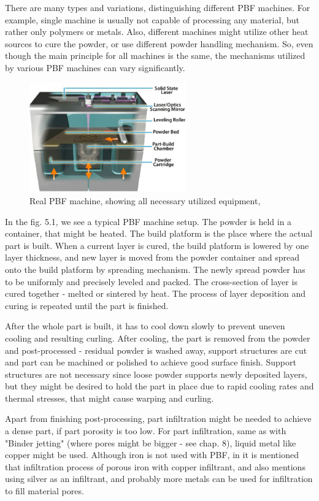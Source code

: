 \documentclass[a4paper, 11pt, reqno]{report}
\begin{document}
	There are many types and variations, distinguishing different PBF machines. For example, single machine is usually not capable of processing any material, but rather only polymers or metals. Also, different machines might utilize other heat sources to cure the powder, or use different powder handling mechanism. So, even though the main principle for all machines is the same, the mechanisms utilized by various PBF machines can vary significantly.
\\
\begin{figure}[b!]
	\centering
 	\includegraphics[width=0.6\textwidth]{sls}
	\caption{Real PBF machine, showing all necessary utilized equipment, \cite{sheena} }
\end{figure}
	In the fig. 5.1, we see a typical PBF machine setup. The powder is held in a container, that might be heated. The build platform is the place where the actual part is built. When a current layer is cured, the build platform is lowered by one layer thickness, and new layer is moved from the powder container and spread onto the build platform by spreading mechanism. The newly spread powder has to be uniformly and precisely leveled and packed. The cross-section of layer is cured together - melted or sintered by heat. The process of layer deposition and curing is repeated until the part is finished.

	After the whole part is built, it has to cool down slowly to prevent uneven cooling and resulting curling. After cooling, the part is removed from the powder and post-processed - residual powder is washed away, support structures are cut and part can be machined or polished to achieve good surface finish. Support structures are not necessary since loose powder supports newly deposited layers, but they might be desired to hold the part in place due to rapid cooling rates and thermal stresses, that might cause warping and curling.
	
	Apart from finishing post-processing, part infiltration might be needed to achieve a dense part, if part porosity is too low. For part infiltration, same as with "Binder jetting" (where pores might be bigger - see chap. 8), liquid metal like copper might be used. Although iron is not used with PBF, in \cite[162]{LPS} it is mentioned that infiltration process of porous iron with copper infiltrant, and also mentions using silver as an infiltrant, and probably more metals can be used for infiltration to fill material pores.
	
\end{document}
